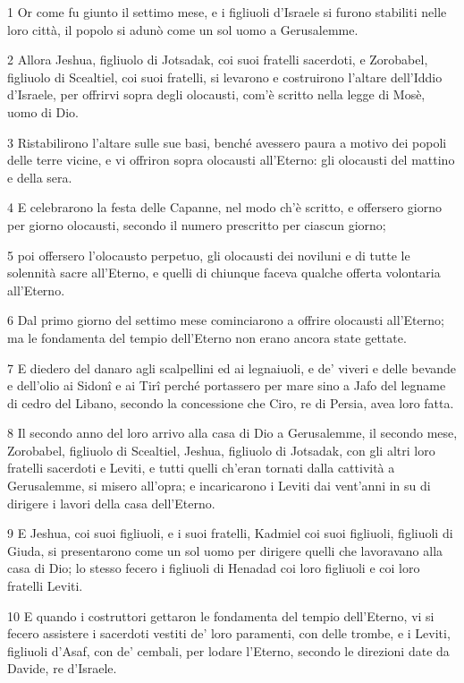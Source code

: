 \par 1 Or come fu giunto il settimo mese, e i figliuoli d'Israele si furono stabiliti nelle loro città, il popolo si adunò come un sol uomo a Gerusalemme.
\par 2 Allora Jeshua, figliuolo di Jotsadak, coi suoi fratelli sacerdoti, e Zorobabel, figliuolo di Scealtiel, coi suoi fratelli, si levarono e costruirono l'altare dell'Iddio d'Israele, per offrirvi sopra degli olocausti, com'è scritto nella legge di Mosè, uomo di Dio.
\par 3 Ristabilirono l'altare sulle sue basi, benché avessero paura a motivo dei popoli delle terre vicine, e vi offriron sopra olocausti all'Eterno: gli olocausti del mattino e della sera.
\par 4 E celebrarono la festa delle Capanne, nel modo ch'è scritto, e offersero giorno per giorno olocausti, secondo il numero prescritto per ciascun giorno;
\par 5 poi offersero l'olocausto perpetuo, gli olocausti dei noviluni e di tutte le solennità sacre all'Eterno, e quelli di chiunque faceva qualche offerta volontaria all'Eterno.
\par 6 Dal primo giorno del settimo mese cominciarono a offrire olocausti all'Eterno; ma le fondamenta del tempio dell'Eterno non erano ancora state gettate.
\par 7 E diedero del danaro agli scalpellini ed ai legnaiuoli, e de' viveri e delle bevande e dell'olio ai Sidonî e ai Tirî perché portassero per mare sino a Jafo del legname di cedro del Libano, secondo la concessione che Ciro, re di Persia, avea loro fatta.
\par 8 Il secondo anno del loro arrivo alla casa di Dio a Gerusalemme, il secondo mese, Zorobabel, figliuolo di Scealtiel, Jeshua, figliuolo di Jotsadak, con gli altri loro fratelli sacerdoti e Leviti, e tutti quelli ch'eran tornati dalla cattività a Gerusalemme, si misero all'opra; e incaricarono i Leviti dai vent'anni in su di dirigere i lavori della casa dell'Eterno.
\par 9 E Jeshua, coi suoi figliuoli, e i suoi fratelli, Kadmiel coi suoi figliuoli, figliuoli di Giuda, si presentarono come un sol uomo per dirigere quelli che lavoravano alla casa di Dio; lo stesso fecero i figliuoli di Henadad coi loro figliuoli e coi loro fratelli Leviti.
\par 10 E quando i costruttori gettaron le fondamenta del tempio dell'Eterno, vi si fecero assistere i sacerdoti vestiti de' loro paramenti, con delle trombe, e i Leviti, figliuoli d'Asaf, con de' cembali, per lodare l'Eterno, secondo le direzioni date da Davide, re d'Israele.
